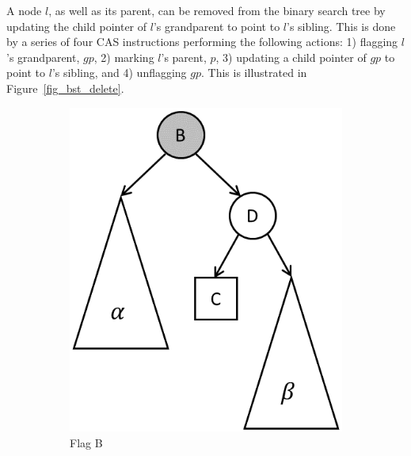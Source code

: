 \documentclass[letterpaper,twocolumn]{article}
\begin{document}
A node $l$, as well as its parent, can be removed from the binary search tree by updating the child pointer of $l$'s grandparent to point to $l$'s sibling. This is done by a series of four CAS instructions performing the following actions: 1) flagging $l$'s grandparent, $gp$, 2) marking $l$'s parent, $p$, 3) updating a child pointer of $gp$ to point to $l$'s sibling, and 4) unflagging $gp$. This is illustrated in Figure~\ref{fig_bst_delete}.

\begin{figure}[!bt]
	\centering
	\begin{subfigure}[b]{0.2\textwidth}\centering
		\includegraphics[width=1\textwidth]{bst_del_2.png}
		\caption{Flag B}
	\end{subfigure}
	\qquad
	\begin{subfigure}[b]{0.2\textwidth}\centering

\end{subfigure}
\end{figure}
\end{document}
